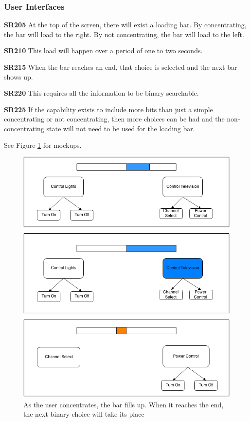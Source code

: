 \documentclass{article}
\begin{document}
\subsubsection{User Interfaces}

\textbf{SR205} At the top of the screen, there will exist a loading bar. By concentrating, the bar will load to the right. By not concentrating, the bar will load to the left. 

\textbf{SR210} This load will happen over a period of one to two seconds. 

\textbf{SR215} When the bar reaches an end, that choice is selected and the next bar shows up. 

\textbf{SR220} This requires all the information to be binary searchable. 

\textbf{SR225} If the capability exists to include more bits than just a simple concentrating or not concentrating, then more choices can be had and the non-concentrating state will not need to be used for the loading bar. 

See Figure \ref{fig:mockup} for mockups.

\begin{figure}
\includegraphics[width=\textwidth]{mockup_v1.png}
\caption{As the user concentrates, the bar fills up. When it reaches the end, the next binary choice will take its place}
\label{fig:mockup}
\end{figure}
\end{document}
